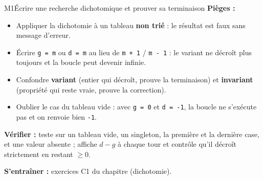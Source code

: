 \begin{fichemethode}{M1}{Écrire une recherche dichotomique et prouver sa terminaison}
\textbf{Pièges :}
\begin{itemize}
  \item Appliquer la dichotomie à un tableau \textbf{non trié} : le résultat est faux sans message d'erreur.
  \item Écrire \lstinline{g = m} ou \lstinline{d = m} au lieu de \lstinline{m + 1} / \lstinline{m - 1} : le variant ne décroît plus toujours et la boucle peut devenir infinie.
  \item Confondre \textbf{variant} (entier qui décroît, prouve la terminaison) et \textbf{invariant} (propriété qui reste vraie, prouve la correction).
  \item Oublier le cas du tableau vide : avec \lstinline{g = 0} et \lstinline{d = -1}, la boucle ne s'exécute pas et on renvoie bien \lstinline{-1}.
\end{itemize}

\textbf{Vérifier :} teste sur un tableau vide, un singleton, la première et la dernière case, et une valeur absente ; affiche $d-g$ à chaque tour et contrôle qu'il décroît strictement en restant $\geq 0$.

\textbf{S'entraîner :} exercices C1 du chapitre (dichotomie).
\end{fichemethode}
